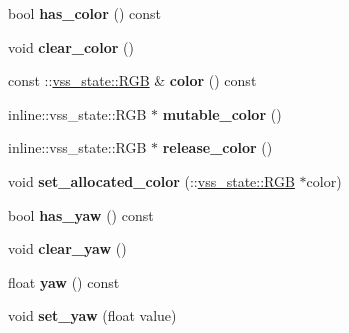 \begin{DoxyCompactItemize}
\item 
\hypertarget{classvss__state_1_1Robot__State_a319868975523f46fce84fedda26c478e}{bool {\bfseries has\-\_\-color} () const }\label{classvss__state_1_1Robot__State_a319868975523f46fce84fedda26c478e}

\item 
\hypertarget{classvss__state_1_1Robot__State_a0d95199c67056fd8a0b6bb873d278392}{void {\bfseries clear\-\_\-color} ()}\label{classvss__state_1_1Robot__State_a0d95199c67056fd8a0b6bb873d278392}

\item 
\hypertarget{classvss__state_1_1Robot__State_a1e8b02c137ceae1f7a875bdf5371aa91}{const \-::\hyperlink{classvss__state_1_1RGB}{vss\-\_\-state\-::\-R\-G\-B} \& {\bfseries color} () const }\label{classvss__state_1_1Robot__State_a1e8b02c137ceae1f7a875bdf5371aa91}

\item 
\hypertarget{classvss__state_1_1Robot__State_aa91b85fa199de6f9b4673529f86f1d01}{inline\-::vss\-\_\-state\-::\-R\-G\-B $\ast$ {\bfseries mutable\-\_\-color} ()}\label{classvss__state_1_1Robot__State_aa91b85fa199de6f9b4673529f86f1d01}

\item 
\hypertarget{classvss__state_1_1Robot__State_aba8a8ff5aa02a978e3ff2e8b6335f0ce}{inline\-::vss\-\_\-state\-::\-R\-G\-B $\ast$ {\bfseries release\-\_\-color} ()}\label{classvss__state_1_1Robot__State_aba8a8ff5aa02a978e3ff2e8b6335f0ce}

\item 
\hypertarget{classvss__state_1_1Robot__State_a368a1f90ce946cd075aa050885e1e6d3}{void {\bfseries set\-\_\-allocated\-\_\-color} (\-::\hyperlink{classvss__state_1_1RGB}{vss\-\_\-state\-::\-R\-G\-B} $\ast$color)}\label{classvss__state_1_1Robot__State_a368a1f90ce946cd075aa050885e1e6d3}

\item 
\hypertarget{classvss__state_1_1Robot__State_a7f07f9c8c553babff64eb056a103c189}{bool {\bfseries has\-\_\-yaw} () const }\label{classvss__state_1_1Robot__State_a7f07f9c8c553babff64eb056a103c189}

\item 
\hypertarget{classvss__state_1_1Robot__State_a1f023fdc194aea61557b0cba586e3b1a}{void {\bfseries clear\-\_\-yaw} ()}\label{classvss__state_1_1Robot__State_a1f023fdc194aea61557b0cba586e3b1a}

\item 
\hypertarget{classvss__state_1_1Robot__State_a16a51084f1e143e9cc0eff17991f42fe}{float {\bfseries yaw} () const }\label{classvss__state_1_1Robot__State_a16a51084f1e143e9cc0eff17991f42fe}

\item 
\hypertarget{classvss__state_1_1Robot__State_a80d78f0f346441c0e0407ff6503ee3eb}{void {\bfseries set\-\_\-yaw} (float value)}\label{classvss__state_1_1Robot__State_a80d78f0f346441c0e0407ff6503ee3eb}

\end{DoxyCompactItemize}
